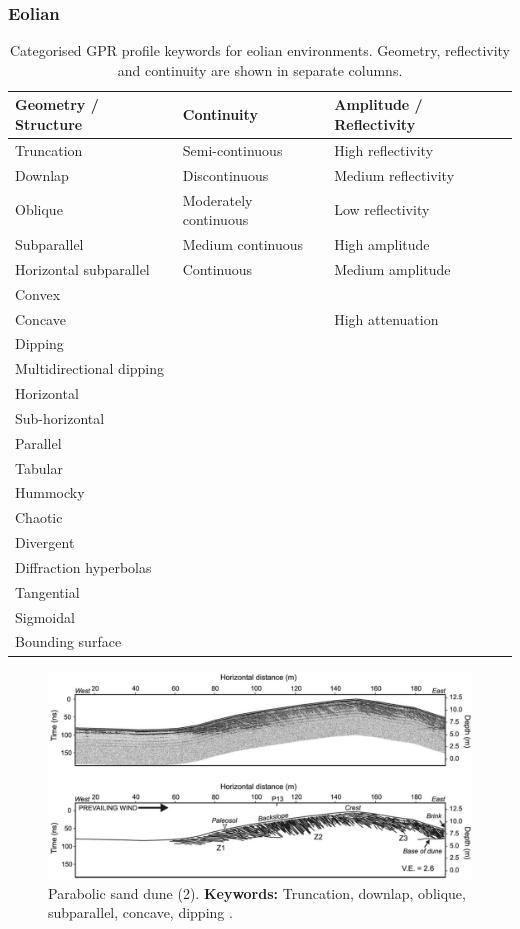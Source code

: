 \clearpage
\subsubsection{Eolian}
\begin{table}[h!]
\centering
\caption{Categorised GPR profile keywords for eolian environments. Geometry, reflectivity and continuity are shown in separate columns.}
\begin{tabular}{|p{5cm}|p{5cm}|p{5cm}|}
\hline
\textbf{Geometry / Structure} & \textbf{Continuity} & \textbf{Amplitude / Reflectivity} \\
\hline
Truncation & Semi-continuous & High reflectivity \\
Downlap & Discontinuous & Medium reflectivity \\
Oblique & Moderately continuous & Low reflectivity \\
Subparallel & Medium continuous & High amplitude \\
Horizontal subparallel & Continuous & Medium amplitude \\
Convex & &  \\
Concave & & High attenuation \\
Dipping & & \\
Multidirectional dipping & & \\
Horizontal & & \\
Sub-horizontal & & \\
Parallel & & \\
Tabular & & \\
Hummocky & & \\
Chaotic & & \\
Divergent & & \\
Diffraction hyperbolas & & \\
Tangential & & \\
Sigmoidal & & \\
Bounding surface & & \\
\hline
\end{tabular}
\label{tab:dune-coastal-keywords}
\end{table}

\begin{figure}[h!]
    \centering
    \includegraphics[width=0.9\linewidth]{Figures/0.2GPR/Hugenholtz_2007_1.png}
    \caption[Parabolic sand dune (2)]{Parabolic sand dune (2). \textbf{Keywords: } Truncation, downlap, oblique, subparallel, concave, dipping \citep{Hugenholtz2007}.}
    \label{fig:Hugenholtz2007-1}
\end{figure}

